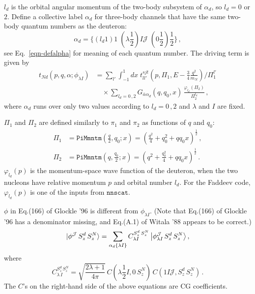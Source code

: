 \documentclass[11pt,aps]{revtex4}
\begin{document}
$l_d$ is the orbital angular momentum of the two-body subsystem of $\alpha_d$, so $l_d = 0$ or $2$. Define a collective label $\alpha_d$ for three-body channels that have the same two-body quantum numbers as the deuteron:
$$
\alpha_d = \{ (l_d 1)1\; (\lambda \frac{1}{2}) I \mathcal{J}\; (0 \frac{1}{2}) \frac{1}{2} \} \, ,
$$
see Eq.~\eqref{eqn-defalpha} for meaning of each quantum number.
The driving term is given by
\begin{equation}
  \begin{split}
t_{Nd}(p, q, \alpha; \phi_{\lambda I}) &= \sum_{l'} \int_{-1}^1 dx\; t_{ll'}^{sjt} (p, \Pi_1, E - \frac{3}{4} \frac{q^2}{m_N})/\Pi_1^{l'} \\
    & \quad \times \sum_{l_d = 0\, , 2}  G_{\bar{\alpha} \alpha_d} (q, q_0, x)\, \frac{\varphi_{l_d}(\Pi_2)}{\Pi_2^{l_d}} \, ,
  \end{split}
\end{equation}
where $\alpha_d$ runs over only two values according to $l_d = 0\, , 2$ and $\lambda$ and $I$ are fixed.

$\Pi_1$ and $\Pi_2$ are defined similarly to $\pi_1$ and $\pi_2$ as functions of $q$ and $q_0$:
\begin{equation}
\begin{split}
  \Pi_1 &= \texttt{PiMmntm}\left(\frac{q}{2}, q_0; x\right) = \left(\frac{q^2}{4} + q_0^2 + q q_0 x \right)^{\frac{1}{2}} \, ,\\
  \Pi_2 &= \texttt{PiMmntm}\left(q, \frac{q_0}{2}; x\right) = \left(q^2 + \frac{q_0^2}{4} + q q_0 x \right)^{\frac{1}{2}} \, .
\end{split}
\end{equation}
 $\varphi_{l_d}(p)$ is the momentum-space wave function of the deuteron, when the two nucleons have relative momentum $p$ and orbital number $l_d$. For the Faddeev code, $\varphi_{l_d}(p)$ is one of the inputs from $\texttt{nnscat}$.

$\phi$ in Eq.(166) of Glockle '96 is different from $\phi_{\lambda I}$. (Note that Eq.(166) of Glockle '96 has a denominator missing, and Eq.(A.1) of Witala '88 appears to be correct.)
\begin{equation}
  | \phi^\mathcal{J}\, S_z^d\, S_z^N \rangle = \sum_{\alpha_d\{\lambda I\}} C_{\lambda I}^{S_z^d\, S_z^N}\, \big{|}\phi^\mathcal{J}_{\lambda I}\, S_z^d\, S_z^N \big{\rangle} \, ,
\end{equation}
where
\begin{equation}
  C_{\lambda\, I}^{S_z^d\, S_z^N} = \sqrt{\frac{2\lambda + 1}{4\pi}}\,
   C(\lambda \frac{1}{2} I, 0\, S_z^N)\, C(1I\mathcal{J}, S_z^d\, S_z^N) \, . \label{eqn-CCC}
\end{equation}
The $C$'s on the right-hand side of the above equations are CG coefficients.
\end{document}
